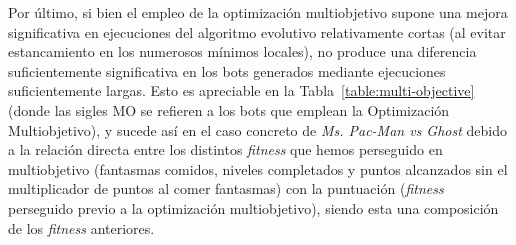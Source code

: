 Por último, si bien el empleo de la optimización multiobjetivo supone una mejora significativa en ejecuciones del algoritmo evolutivo relativamente cortas (al evitar estancamiento en los numerosos mínimos locales), no produce una diferencia suficientemente significativa en los bots generados mediante ejecuciones suficientemente largas. Esto es apreciable en la Tabla~\ref{table:multi-objective} (donde las sigles MO se refieren a los bots que emplean la Optimización Multiobjetivo), y sucede así en el caso concreto de \textit{Ms. Pac-Man vs Ghost} debido a la relación directa entre los distintos \textit{fitness} que hemos perseguido en multiobjetivo (fantasmas comidos, niveles completados y puntos alcanzados sin el multiplicador de puntos al comer fantasmas) con la puntuación (\textit{fitness} perseguido previo a la optimización multiobjetivo), siendo esta una composición de los \textit{fitness} anteriores.

